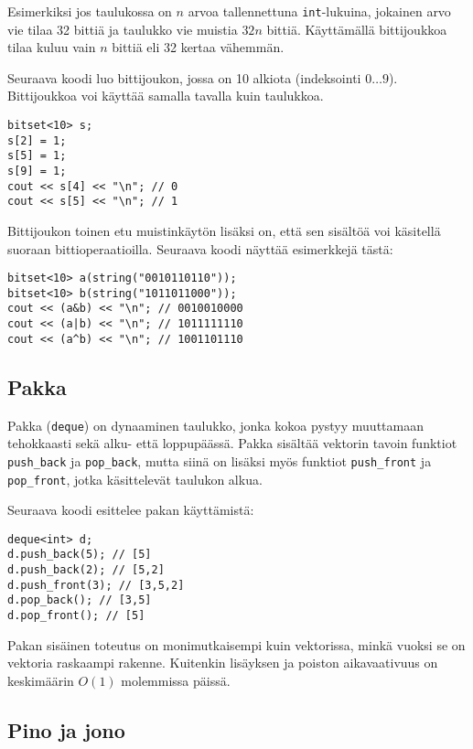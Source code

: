 Esimerkiksi jos taulukossa on $n$ arvoa
tallennettuna \texttt{int}-lukuina,
jokainen arvo vie tilaa 32 bittiä ja taulukko
vie muistia $32n$ bittiä.
Käyttämällä bittijoukkoa tilaa
kuluu vain $n$ bittiä eli 32 kertaa vähemmän.

Seuraava koodi luo bittijoukon, jossa on 10 alkiota
(indeksointi $0 \ldots 9$).
Bittijoukkoa voi käyttää samalla tavalla kuin taulukkoa.
\begin{lstlisting}
bitset<10> s;
s[2] = 1;
s[5] = 1;
s[9] = 1;
cout << s[4] << "\n"; // 0
cout << s[5] << "\n"; // 1
\end{lstlisting}

Bittijoukon toinen etu muistinkäytön lisäksi on,
että sen sisältöä voi käsitellä suoraan bittioperaatioilla.
Seuraava koodi näyttää esimerkkejä tästä:

\begin{lstlisting}
bitset<10> a(string("0010110110"));
bitset<10> b(string("1011011000"));
cout << (a&b) << "\n"; // 0010010000
cout << (a|b) << "\n"; // 1011111110
cout << (a^b) << "\n"; // 1001101110
\end{lstlisting}

\subsection{Pakka}

Pakka (\texttt{deque}) on dynaaminen taulukko,
jonka kokoa pystyy muuttamaan tehokkaasti
sekä alku- että loppupäässä.
Pakka sisältää vektorin tavoin
funktiot \texttt{push\_back}
ja \texttt{pop\_back}, mutta siinä on lisäksi myös funktiot
\texttt{push\_front} ja \texttt{pop\_front},
jotka käsittelevät taulukon alkua.

Seuraava koodi esittelee pakan käyttämistä:

\begin{lstlisting}
deque<int> d;
d.push_back(5); // [5]
d.push_back(2); // [5,2]
d.push_front(3); // [3,5,2]
d.pop_back(); // [3,5]
d.pop_front(); // [5]
\end{lstlisting}

Pakan sisäinen toteutus on monimutkaisempi kuin
vektorissa, minkä vuoksi se on
vektoria raskaampi rakenne.
Kuitenkin lisäyksen ja poiston
aikavaativuus on keskimäärin $O(1)$ molemmissa päissä.

\subsection{Pino ja jono}

